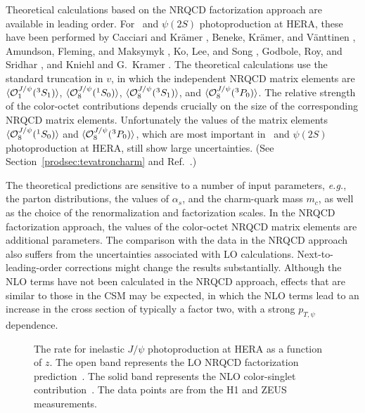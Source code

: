 Theoretical calculations based on the NRQCD factorization approach 
\cite{Caswell:1985ui,Thacker:1990bm,Bodwin:1994jh} are 
available in leading order. For \jpsi\ and $\psi(2S)$ photoproduction
at HERA, these have been performed by Cacciari and Kr\"amer
\cite{Cacciari:1996dg}, Beneke, Kr\"amer, and V\"anttinen
\cite{Beneke:1998re}, Amundson, Fleming, and Maksymyk
\cite{Amundson:1996ik}, Ko, Lee, and Song \cite{Ko:1996xw},
Godbole, Roy, and Sridhar \cite{Godbole:1995ie}, and Kniehl and
G.~Kramer \cite{Kniehl:1997fv,Kniehl:1997gh}. The theoretical
calculations use the standard truncation in $v$, in which 
the independent NRQCD matrix elements are 
$\langle {\cal O}_1^{J/\psi}({}^3S_1) \rangle$, $\langle {\cal
O}_8^{J/\psi}({}^1S_0)
\rangle$, $\langle {\cal O}_8^{J/\psi}({}^3S_1) \rangle$, and $\langle
{\cal O}_8^{J/\psi}({}^3P_0) \rangle$.  The relative strength of the
color-octet contributions depends crucially on the size of the
corresponding NRQCD matrix elements. Unfortunately the values of the
matrix elements $\langle {\cal O}_8^{J/\psi}({}^1S_0) \rangle$ and
$\langle {\cal O}_8^{J/\psi}({}^3P_0) \rangle$, which are most
important in \jpsi\ and $\psi(2S)$ photoproduction at HERA, still show
large uncertainties. (See Section~\ref{prodsec:tevatroncharm} and
Ref.~\cite{Kramer:2001hh}.)

The theoretical predictions are sensitive to a number of input
parameters, {\it e.g.}, the parton distributions, the values of
$\alpha_s$, and the charm-quark mass $m_c$, as well as the choice of the
renormalization and factorization scales. In the NRQCD factorization
approach, the values of the color-octet NRQCD matrix elements are
additional parameters.  The comparison with the data in the NRQCD
approach also suffers from the uncertainties associated with LO
calculations. Next-to-leading-order corrections might change the results
substantially. Although the NLO terms have not been calculated in the
NRQCD approach, effects that are similar to those in the CSM may be
expected, in which the NLO terms lead to an increase in the cross
section of typically a factor two, with a strong \ensuremath{p_{T,\psi}}
dependence.

\begin{figure}
\begin{center}
\caption{The rate for inelastic $J/\psi$ photoproduction at HERA
 as a function of $z$. The open band represents the LO
 NRQCD factorization prediction~\cite{Kramer:2001hh}. The solid band
 represents the NLO color-singlet
 contribution~\cite{Kramer:1995nb,Kramer:2001hh}. The data points are
 from the H1
\cite{Adloff:2002ex} and ZEUS
\cite{Chekanov:2002at} measurements.}
\label{fig-photo-prod}
\end{center}
\end{figure}

